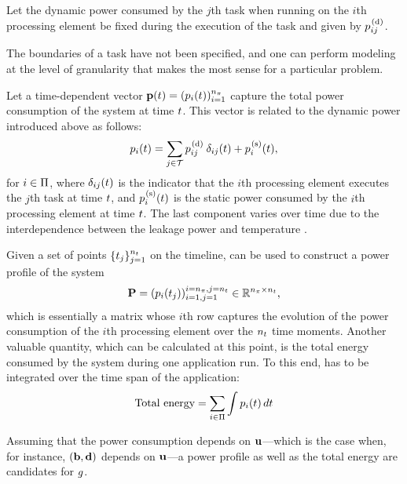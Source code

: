 Let the dynamic power consumed by the $j$th task when running on the $i$th
processing element be fixed during the execution of the task and given by
$p^{\text{\kern0.1em(d)}}_{ij}$.

\begin{remark}
The boundaries of a task have not been specified, and one can perform modeling
at the level of granularity that makes the most sense for a particular problem.
\end{remark}

Let a time-dependent vector $\mathbf{p}(t) = (p_i(t))_{i = 1}^{{n_\pi}}$ capture the
total power consumption of the system at time $t$. This vector is related to
the dynamic power introduced above as follows:
\begin{equation} \elab{power}
  \p_i(\t) = \sum_{j \in \tasks} \p^\dynamic_{ij} \: \delta_{ij} (\t) + \p^\static_i(\t),
\end{equation}
for $i \in \Pi$, where $\delta_{ij}(t)$ is the indicator that the $i$th
processing element executes the $j$th task at time $t$, and $p^{\text{\kern0.1em(s)}}_i(t)$
is the static power consumed by the $i$th processing element at time $t$. The
last component varies over time due to the interdependence between the leakage
power and temperature \cite{liu2007}.

Given a set of points $\{ t_j \}_{j = 1}^{n_t}$ on the timeline,  can
be used to construct a power profile of the system
\[
  \mathbf{P} = (p_i(t_j))_{i = 1, j = 1}^{i = {n_\pi}, j = {n_t}} \in \mathbb{R}^{{n_\pi} \times {n_t}},
\]
which is essentially a matrix whose $i$th row captures the evolution of the
power consumption of the $i$th processing element over the ${n_t}$ time moments.
Another valuable quantity, which can be calculated at this point, is the total
energy consumed by the system during one application run. To this end,
 has to be integrated over the time span of the application:
\begin{equation} \elab{total-energy}
  \text{Total energy} = \sum_{i \in \procs} \int \p_i(\t) \, d\t
\end{equation}

Assuming that the power consumption depends on $\mathbf{u}$---which is the case when,
for instance, $(\mathbf{b}, \mathbf{d})$ depends on $\mathbf{u}$---a power profile as well as the
total energy are candidates for $g$.
